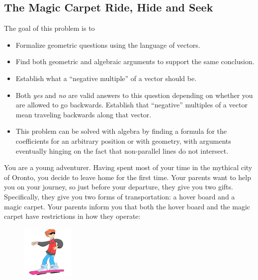 \begin{iola}
\section*{The Magic Carpet Ride, Hide and Seek}
\question

\begin{annotation}
	\begin{goals}

		The goal of this problem is to
		\begin{itemize}
			\item Formalize geometric questions using the language of vectors.
			\item Find both geometric and algebraic arguments to support the same
				conclusion.
			\item Establish what a ``negative multiple'' of a vector should be.
		\end{itemize}
	\end{goals}
	\begin{notes}
		\begin{itemize}
			\item Both \emph{yes} and \emph{no} are valid answers to
				this question depending on whether you are allowed
				to go backwards. Establish that ``negative'' multiples of
				a vector mean traveling backwards along that vector.
			\item This problem can be solved with algebra by finding a formula
				for the coefficients for an arbitrary position or with geometry,
				with arguments eventually hinging on the fact that non-parallel
				lines do not intersect.
		\end{itemize}
	\end{notes}
\end{annotation}
You are a young adventurer. Having spent most of your time in the mythical city of Oronto,
	you decide to leave home for the first time. Your parents
want to help you on your journey, so just before your departure, they give
you two gifts. Specifically, they give you two forms of transportation:
a hover board and a magic carpet. Your parents inform you that both the
hover board and the magic carpet have restrictions in how they operate:



\begin{minipage}{\textwidth}
	\vspace{.5cm}
	\begin{figure}
	\vspace{-.8cm}
	\includegraphics[width=1in]{images/HoverBoard-small.png}
	\end{figure}


\end{minipage}
\end{iola}
